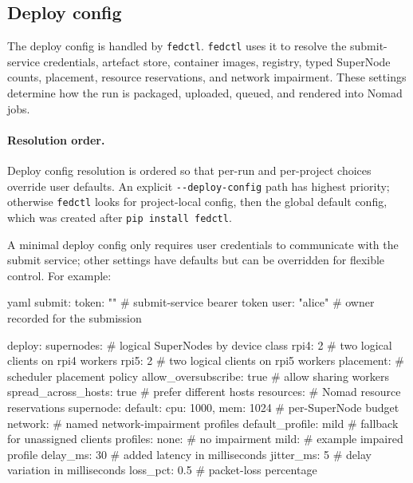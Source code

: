 \FloatBarrier
\subsection[Deploy config]{Deploy config }

The deploy config is handled by \texttt{fedctl}. \texttt{fedctl} uses it to resolve the submit-service credentials, artefact store, container images, registry, typed SuperNode counts, placement, resource reservations, and network impairment. These settings determine how the run is packaged, uploaded, queued, and rendered into Nomad jobs.

\paragraph{Resolution order.}
Deploy config resolution is ordered so that per-run and per-project choices override user defaults. An explicit \verb|--deploy-config| path has highest priority; otherwise \texttt{fedctl} looks for project-local config, then the global default config, which was created after \texttt{pip install fedctl}.

A minimal deploy config only requires user credentials to communicate with the submit service; other settings have defaults but can be overridden for flexible control. For example:

\hypertarget{example:concrete-deploy-config}{}
\begin{codeblock}{yaml}
submit:
  token: ""        # submit-service bearer token
  user: "alice"    # owner recorded for the submission

deploy:
  supernodes:      # logical SuperNodes by device class
    rpi4: 2        # two logical clients on rpi4 workers
    rpi5: 2        # two logical clients on rpi5 workers
  placement:       # scheduler placement policy
    allow_oversubscribe: true  # allow sharing workers
    spread_across_hosts: true  # prefer different hosts
  resources:       # Nomad resource reservations
    supernode:
      default: { cpu: 1000, mem: 1024 }  # per-SuperNode budget
  network:         # named network-impairment profiles
    default_profile: mild  # fallback for unassigned clients
    profiles:
      none: {}     # no impairment
      mild:        # example impaired profile
        delay_ms: 30   # added latency in milliseconds
        jitter_ms: 5   # delay variation in milliseconds
        loss_pct: 0.5  # packet-loss percentage
\end{codeblock}

